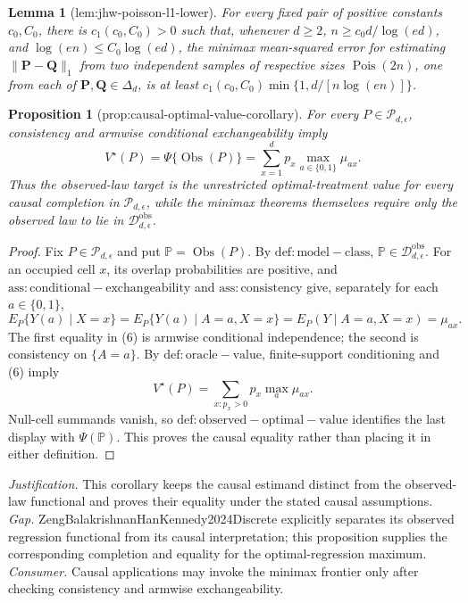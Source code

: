 \documentclass{article}
\newtheorem{lemma}{Lemma}
\newtheorem{proposition}{Proposition}
\begin{document}
\begin{lemma}[lem:jhw-poisson-l1-lower]\label{lem:jhw-poisson-l1-lower}
For every fixed pair of positive constants \(c_0,C_0\), there is \(c_1(c_0,C_0)>0\) such that, whenever \(d\geq2\), \(n\geq c_0d/\log(ed)\), and \(\log(en)\leq C_0\log(ed)\), the minimax mean-squared error for estimating \(\lVert\mathbf P-\mathbf Q\rVert_1\) from two independent samples of respective sizes \(\operatorname{Pois}(2n)\), one from each of \(\mathbf P,\mathbf Q\in\Delta_d\), is at least \(c_1(c_0,C_0)\min\{1,d/[n\log(en)]\}\).
\end{lemma}

\begin{proposition}[prop:causal-optimal-value-corollary]\label{prop:causal-optimal-value-corollary}
For every \(P\in\mathcal P_{d,\epsilon}\), consistency and armwise conditional exchangeability imply
\[
 V^\star(P)=\Psi\{\operatorname{Obs}(P)\}
 =\sum_{x=1}^d p_x\max_{a\in\{0,1\}}\mu_{ax}.
\]
Thus the observed-law target is the unrestricted optimal-treatment value for every causal completion in \(\mathcal P_{d,\epsilon}\), while the minimax theorems themselves require only the observed law to lie in \(\mathcal D_{d,\epsilon}^{\mathrm{obs}}\).
\end{proposition}
\begin{proof}
Fix \(P\in\mathcal P_{d,\epsilon}\) and put \(\mathbb P=\operatorname{Obs}(P)\).  By \(\mathrm{def:model-class}\), \(\mathbb P\in\mathcal D_{d,\epsilon}^{\mathrm{obs}}\).  For an occupied cell \(x\), its overlap probabilities are positive, and \(\mathrm{ass:conditional-exchangeability}\) and \(\mathrm{ass:consistency}\) give, separately for each \(a\in\{0,1\}\),
\[
 E_P\{Y(a)\mid X=x\}
 =E_P\{Y(a)\mid A=a,X=x\}
 =E_P(Y\mid A=a,X=x)=\mu_{ax}.                                     \tag{6}
\]
The first equality in (6) is armwise conditional independence; the second is consistency on \(\{A=a\}\).  By \(\mathrm{def:oracle-value}\), finite-support conditioning and (6) imply
\[
 V^\star(P)=\sum_{x:p_x>0}p_x\max_a\mu_{ax}.
\]
Null-cell summands vanish, so \(\mathrm{def:observed-optimal-value}\) identifies the last display with \(\Psi(\mathbb P)\).  This proves the causal equality rather than placing it in either definition.
\end{proof}
\par\smallskip\noindent \textit{Justification.} This corollary keeps the causal estimand distinct from the observed-law functional and proves their equality under the stated causal assumptions. \textit{Gap.} ZengBalakrishnanHanKennedy2024Discrete explicitly separates its observed regression functional from its causal interpretation; this proposition supplies the corresponding completion and equality for the optimal-regression maximum. \textit{Consumer.} Causal applications may invoke the minimax frontier only after checking consistency and armwise exchangeability.
\end{document}
